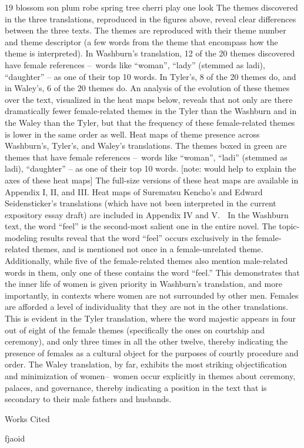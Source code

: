 \documentclass[12pt]{article}
\newcommand{\bibent}{\noindent \hangindent 40pt}
\newenvironment{workscited}{\newpage \begin{center} Works Cited \end{center}}{\newpage }
\begin{document}
\begin{flushleft}
\begin{spacing}{2.0}
19 blossom son plum robe spring tree cherri play one look 
The themes discovered in the three translations, reproduced in the figures above, reveal clear differences between the three texts. The themes are reproduced with their theme number and theme descriptor (a few words from the theme that encompass how the theme is interpreted). In Washburn’s translation, 12 of the 20 themes discovered have female references – words like “woman”, “lady” (stemmed as ladi), “daughter” – as one of their top 10 words. In Tyler’s, 8 of the 20 themes do, and in Waley’s, 6 of the 20 themes do. An analysis of the evolution of these themes over the text, visualized in the heat maps below, reveals that not only are there dramatically fewer female-related themes in the Tyler than the Washburn and in the Waley than the Tyler, but that the frequency of these female-related themes is lower in the same order as well. 
Heat maps of theme presence across Washburn’s, Tyler’s, and Waley’s translations. The themes boxed in green are themes that have female references – words like “woman”, “ladi” (stemmed as ladi), “daughter” – as one of their top 10 words. [note: would help to explain the axes of these heat maps]
The full-size versions of these heat maps are available in Appendix I, II, and III. Heat maps of Surematsu Kencho’s and Edward Seidensticker’s translations (which have not been interpreted in the current expository essay draft) are included in Appendix IV and V. 	In the Washburn text, the word “feel” is the second-most salient one in the entire novel. The topic-modeling results reveal that the word “feel” occurs exclusively in the female-related themes, and is mentioned not once in a female-unrelated theme. Additionally, while five of the female-related themes also mention male-related words in them, only one of these contains the word “feel.” This demonstrates that the inner life of women is given priority in Washburn’s translation, and more importantly, in contexts where women are not surrounded by other men. Females are afforded a level of individuality that they are not in the other translations. This is evident in the Tyler translation, where the word majestic appears in four out of eight of the female themes (specifically the ones on courtship and ceremony), and only three times in all the other twelve, thereby indicating the presence of females as a cultural object for the purposes of courtly procedure and order. The Waley translation, by far, exhibits the most striking objectification and minimization of women– women occur explicitly in themes about ceremony, palaces, and governance, thereby indicating a position in the text that is secondary to their male fathers and husbands. 

\begin{workscited}

\bibent fjaoid	
\end{workscited}



\end{spacing}
\end{flushleft}
\end{document}
